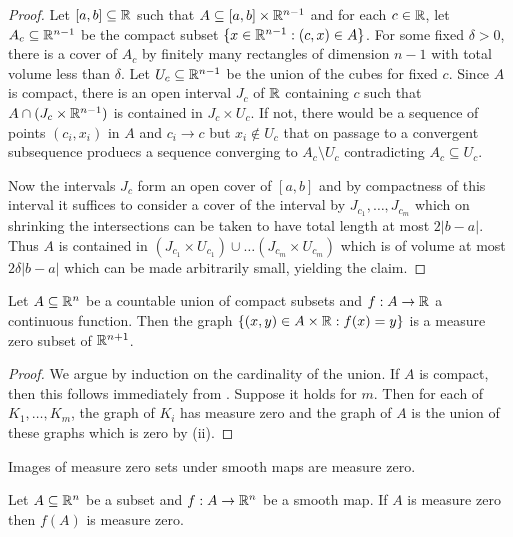 \begin{proof}
    Let $[a,b]\subseteq\mathbb{R}$ such that $A\subseteq[a,b]\times\mathbb{R}^{n-1}$ and for each $c\in\mathbb{R}$, let $A_{c}\subseteq\mathbb{R}^{n-1}$ be the compact subset $\{x\in\mathbb{R}^{n-1}:(c,x)\in A\}$. For some fixed $\delta>0$, there is a cover of $A_{c}$ by finitely many rectangles of dimension $n-1$ with total volume less than $\delta$. Let $U_{c}\subseteq\mathbb{R}^{n-1}$ be the union of the cubes for fixed $c$. Since $A$ is compact, there is an open interval $J_{c}$ of $\mathbb{R}$ containing $c$ such that $A\cap (J_{c}\times\mathbb{R}^{n-1})$ is contained in $J_{c}\times U_{c}$. If not, there would be a sequence of points $(c_{i},x_{i})$ in $A$ and $c_{i}\to c$ but $x_{i}\notin U_{c}$ that on passage to a convergent subsequence produecs a sequence converging to $A_{c}\setminus U_{c}$ contradicting $A_{c}\subseteq U_{c}$. 

    Now the intervals $J_{c}$ form an open cover of $[a,b]$ and by compactness of this interval it suffices to consider a cover of the interval by $J_{c_{1}},\dots,J_{c_{m}}$ which on shrinking the intersections can be taken to have total length at most $2|b-a|$. Thus $A$ is contained in $(J_{c_{1}}\times U_{c_{1}})\cup\dots(J_{c_{m}}\times U_{c_{m}})$ which is of volume at most $2\delta|b-a|$ which can be made arbitrarily small, yielding the claim. 
\end{proof}
\begin{corollary}\label{corr: graph has measure zero}
    Let $A\subseteq\mathbb{R}^{n}$ be a countable union of compact subsets and $f: A\to\mathbb{R}$ a continuous function. Then the graph $\{(x,y)\in A\times\mathbb{R}:f(x)=y\}$ is a measure zero subset of $\mathbb{R}^{n+1}$. 
\end{corollary}
\begin{proof}
    We argue by induction on the cardinality of the union. If $A$ is compact, then this follows immediately from . Suppose it holds for $m$. Then for each of $K_{1},\dots,K_{m}$, the graph of $K_{i}$ has measure zero and the graph of $A$ is the union of these graphs which is zero by  (ii). 
\end{proof}
Images of measure zero sets under smooth maps are measure zero. 
\begin{lemma}\label{lem: images of measure zero are measure zero}
    Let $A\subseteq\mathbb{R}^{n}$ be a subset and $f:A\to\mathbb{R}^{n}$ be a smooth map. If $A$ is measure zero then $f(A)$ is measure zero. 
\end{lemma}
